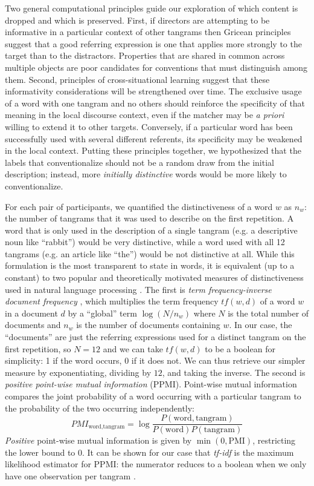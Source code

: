 \documentclass[alpha-refs]{wiley-article}
\begin{document}
Two general computational principles guide our exploration of which content is dropped and which is preserved.
First, if directors are attempting to be informative in a particular context of other tangrams then Gricean principles suggest that a good referring expression is one that applies more strongly to the target than to the distractors. 
Properties that are shared in common across multiple objects are poor candidates for conventions that must distinguish among them.
Second, principles of cross-situational learning suggest that these informativity considerations will be strengthened over time.
The exclusive usage of a word with one tangram and no others should reinforce the specificity of that meaning in the local discourse context, even if the matcher may be \emph{a priori} willing to extend it to other targets.
Conversely, if a particular word has been successfully used with several different referents, its specificity may be weakened in the local context.
Putting these principles together, we hypothesized that the labels that conventionalize should not be a random draw from the initial description; instead, more \emph{initially distinctive} words would be more likely to conventionalize.

For each pair of participants, we quantified the distinctiveness of a word $w$ as $n_w$: the number of tangrams that it was used to describe on the first repetition. 
A word that is only used in the description of a single tangram (e.g. a descriptive noun like ``rabbit'') would be very distinctive, while a word used with all 12 tangrams (e.g. an article like ``the'') would be not distinctive at all.
While this formulation is the most transparent to state in words, it is equivalent (up to a constant) to two popular  and theoretically motivated measures of distinctiveness used in natural language processing \citep{salton1988term}.
The first is \emph{term frequency-inverse document frequency} \citep[tf-idf,][]{sparck1972statistical}, which multiplies the term frequency $tf(w,d)$ of a word $w$ in a document $d$ by a ``global'' term $\log(N/n_w)$ where $N$ is the total number of documents and $n_w$ is the number of documents containing $w$. 
In our case, the ``documents'' are just the referring expressions used for a distinct tangram on the first repetition, so $N=12$ and we can take $tf(w,d)$ to be a boolean for simplicity: 1 if the word occurs, 0 if it does not.
We can thus retrieve our simpler measure by exponentiating, dividing by $12$, and taking the inverse.
The second is \emph{positive point-wise mutual information} (PPMI). 
Point-wise mutual information compares the joint probability of a word occurring with a particular tangram to the probability of the two occurring independently: 
$$PMI_{\textrm{word},\textrm{tangram}} = \log\frac{P(\textrm{word}, \textrm{tangram})}{P(\textrm{word})P(\textrm{tangram})}$$
\emph{Positive} point-wise mutual information is given by $\min(0, \textrm{PMI})$, restricting the lower bound to 0. 
It can be shown for our case that \emph{tf-idf} is the maximum likelihood estimator for PPMI: the numerator reduces to a boolean when we only have one observation per tangram \citep{robertson2004understanding}.
\end{document}
